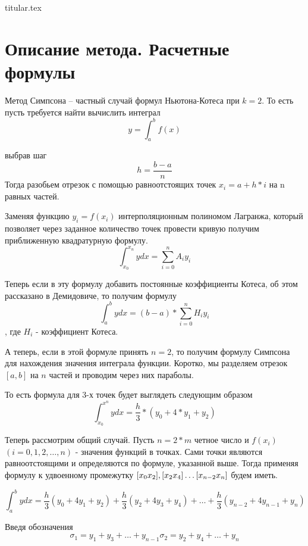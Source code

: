 \documentclass[11pt, a4paper]{article}
\begin{document}
{titular.tex}
\newpage

\section{Описание метода. Расчетные формулы}

Метод Симпсона -- частный случай формул Ньютона-Котеса при $k = 2$. То есть пусть требуется найти 
вычислить интеграл 
\[
y = \int_a^b f(x)
\]

выбрав шаг 
\[
  h = \dfrac{b - a}{n}
\]
Тогда разобьем отрезок с помощью равноотстоящих точек $x_i = a + h * i$ на n равных частей.

Заменяя функцию $y_i = f(x_i)$ интерполяционным полиномом Лагранжа, который позволяет через 
заданное количество точек провести кривую получим приближенную квадратурную формулу.
\[
  \int_{x_0}^{x_n} y dx = \sum_{i = 0}^{n} A_i y_i
\]

Теперь если в эту формулу добавить постоянные коэффициенты Котеса, об этом рассказано в Демидовиче, то получим 
формулу
\[
  \int_{a}^b y dx = (b-a) * \sum_{i = 0}^n H_i y_i
\], 
где $H_i$ - коэффициент Котеса.

А теперь, если в этой формуле принять $n = 2$, то получим формулу Симпсона для нахождения 
значения интеграла функции. Коротко, мы разделяем отрезок $[a, b]$ на $n$ частей и проводим
через них параболы. 

То есть формула для 3-х точек будет выглядеть следующим образом  
\[
  \int_{x_0}^{x^n} y dx = \dfrac{h}{3} * (y_0 + 4 * y_1 + y_2)
\]
\medskip

Теперь рассмотрим общий случай. Пусть $n = 2*m$ четное число и $f(x_i)$ $(i = 0, 1, 2, \ldots, n)$ - значения функций в точках.
Сами точки являются равноотстоящими и определяются по формуле, указанной выше. Тогда применяя 
формулу к удвоенному промежутку $[x_0 x_2], [x_2 x_4] \\ \ldots [x_{n-2} x_n]$ будем иметь.

\begin{equation*}
  \int_a^b y dx = \dfrac{h}{3} (y_0 + 4y_1 + y_2) + \dfrac{h}{3} (y_2 + 4y_3 + y_4) + \ldots
  + \dfrac{h}{3} (y_{n-2} + 4y_{n-1} + y_n) 
\end{equation*}

Введя обозначения 
\begin{equation*}
  \sigma_1 = y_1 + y_3 + \ldots + y_{n-1}

  \sigma_2 = y_2 + y_4 + \ldots + y_n
\end{equation*}
\end{document}
